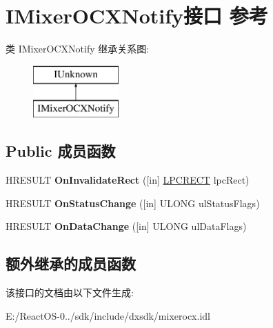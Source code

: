 \hypertarget{interface_i_mixer_o_c_x_notify}{}\section{I\+Mixer\+O\+C\+X\+Notify接口 参考}
\label{interface_i_mixer_o_c_x_notify}
类 I\+Mixer\+O\+C\+X\+Notify 继承关系图\+:\begin{figure}[H]
\begin{center}
\leavevmode
\includegraphics[height=2.000000cm]{interface_i_mixer_o_c_x_notify}
\end{center}
\end{figure}
\subsection*{Public 成员函数}
\begin{DoxyCompactItemize}
\item 
\mbox{\label{interface_i_mixer_o_c_x_notify_a7dc97aa3e7fb07cccbd8c2814e9e3e7d}} 
H\+R\+E\+S\+U\+LT {\bfseries On\+Invalidate\+Rect} (\mbox{[}in\mbox{]} \hyperlink{structtag_r_e_c_t}{L\+P\+C\+R\+E\+CT} lpc\+Rect)
\item 
\mbox{\label{interface_i_mixer_o_c_x_notify_a23c29cb1c2e19ff02d422d66869f9136}} 
H\+R\+E\+S\+U\+LT {\bfseries On\+Status\+Change} (\mbox{[}in\mbox{]} U\+L\+O\+NG ul\+Status\+Flags)
\item 
\mbox{\label{interface_i_mixer_o_c_x_notify_a6dcd6bce96c2c047a91f8411b0b339c2}} 
H\+R\+E\+S\+U\+LT {\bfseries On\+Data\+Change} (\mbox{[}in\mbox{]} U\+L\+O\+NG ul\+Data\+Flags)
\end{DoxyCompactItemize}
\subsection*{额外继承的成员函数}


该接口的文档由以下文件生成\+:\begin{DoxyCompactItemize}
\item 
E\+:/\+React\+O\+S-\/0../sdk/include/dxsdk/mixerocx.\+idl\end{DoxyCompactItemize}
